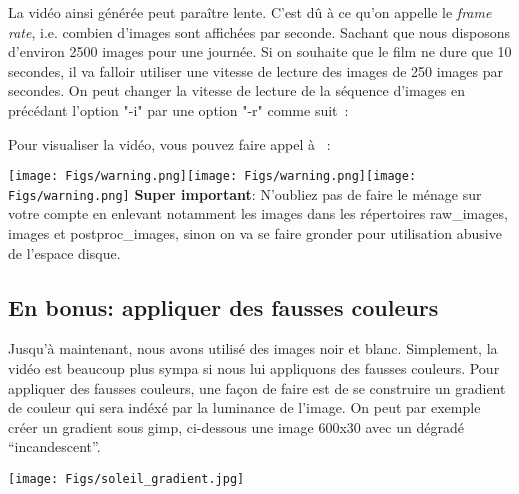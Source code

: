 La vidéo ainsi générée peut paraître lente. C'est dû à ce qu'on appelle le \emph{frame rate}, i.e. combien d'images sont affichées par seconde. Sachant que nous disposons d'environ 2500 images pour une journée. Si on souhaite que le film ne dure que 10 secondes, il va falloir utiliser une vitesse de lecture des images de 250 images par secondes. On peut changer la vitesse de lecture de la séquence d'images en précédant l'option "-i" par une option "-r" comme suit~:
\begin{center}
\end{center}

Pour visualiser la vidéo, vous pouvez faire appel à \mplayer~:
\begin{center}
\end{center}


\begin{center}
\colorbox{lblue}{\begin{minipage}{\linewidth}
\texttt{[image: Figs/warning.png]}\texttt{[image: Figs/warning.png]}\texttt{[image: Figs/warning.png]}
\textbf{Super important}: N'oubliez pas de faire le ménage sur votre compte en enlevant notamment les images dans les répertoires raw\_images, images et postproc\_images, sinon on va se faire gronder pour utilisation abusive de l'espace disque.
\end{minipage}}
\end{center}

\subsection{En bonus: appliquer des fausses couleurs}

Jusqu'à maintenant, nous avons utilisé des images noir et blanc. Simplement, la vidéo est beaucoup plus sympa si nous lui appliquons des fausses couleurs. Pour appliquer des fausses couleurs, une façon de faire est de se construire un gradient de couleur qui sera indéxé par la luminance de l'image. On peut par exemple créer un gradient sous gimp, ci-dessous une image 600x30 avec un dégradé ``incandescent''.
\begin{center}
\texttt{[image: Figs/soleil\_gradient.jpg]}
\end{center}

